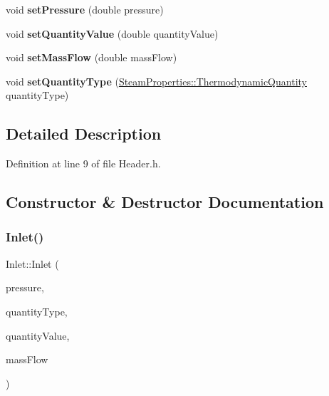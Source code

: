 \begin{DoxyCompactItemize}
\mbox{\label{class_inlet_ad0d848976347160293c6576e005f090b}} 
void {\bfseries set\+Pressure} (double pressure)
\item 
\mbox{\label{class_inlet_a64a5567c35c89f82f5782bf7b83b90c3}} 
void {\bfseries set\+Quantity\+Value} (double quantity\+Value)
\item 
\mbox{\label{class_inlet_a1e427ac34eeebf46546ed53499359459}} 
void {\bfseries set\+Mass\+Flow} (double mass\+Flow)
\item 
\mbox{\label{class_inlet_a4171632101de3f4c97c93bb06c6b51e4}} 
void {\bfseries set\+Quantity\+Type} (\hyperlink{class_steam_properties_ae0294bedf7d178c2d8fb6aed0f62fbff}{Steam\+Properties\+::\+Thermodynamic\+Quantity} quantity\+Type)
\end{DoxyCompactItemize}


\subsection{Detailed Description}


Definition at line 9 of file Header.\+h.



\subsection{Constructor \& Destructor Documentation}
\mbox{\label{class_inlet_a1b0e1d27b8c7b11cfd96623b1c0b8a9e}} 
\subsubsection{\texorpdfstring{Inlet()}{Inlet()}\hspace{0.1cm}{\footnotesize\ttfamily [1/3]}}
{\footnotesize\ttfamily Inlet\+::\+Inlet (\begin{DoxyParamCaption}\item[{double}]{pressure,  }\item[{\hyperlink{class_steam_properties_ae0294bedf7d178c2d8fb6aed0f62fbff}{Steam\+Properties\+::\+Thermodynamic\+Quantity}}]{quantity\+Type,  }\item[{double}]{quantity\+Value,  }\item[{double}]{mass\+Flow }\end{DoxyParamCaption})}

